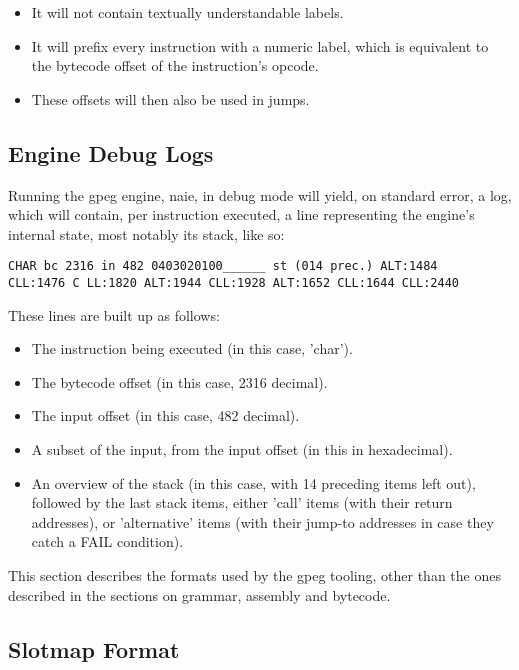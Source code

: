 \begin{itemize}
\item It will not contain textually understandable labels.
\item It will prefix every instruction with a numeric label, which is
      equivalent to the bytecode offset of the instruction's opcode.
\item These offsets will then also be used in jumps.
\end{itemize}

\subsection{Engine Debug Logs}

Running the gpeg engine, naie, in debug mode will yield, on standard error,
a log, which will contain, per instruction executed, a line representing
the engine's internal state, most notably its stack, like so:

\begin{myquote}
\begin{verbatim}
CHAR bc 2316 in 482 0403020100______ st (014 prec.) ALT:1484
CLL:1476 C LL:1820 ALT:1944 CLL:1928 ALT:1652 CLL:1644 CLL:2440
\end{verbatim}
\end{myquote}

These lines are built up as follows:

\begin{itemize}
\item The instruction being executed (in this case, 'char').
\item The bytecode offset (in this case, 2316 decimal).
\item The input offset (in this case, 482 decimal).
\item A subset of the input, from the input offset (in this in hexadecimal).
\item An overview of the stack (in this case, with 14 preceding items left
      out), followed by the last stack items, either 'call' items
      (with their return addresses), or 'alternative' items
      (with their jump-to addresses in case they catch a FAIL condition).
\end{itemize}

This section describes the formats used by the gpeg tooling, other than
the ones described in the sections on grammar, assembly and bytecode.

\subsection{Slotmap Format}

